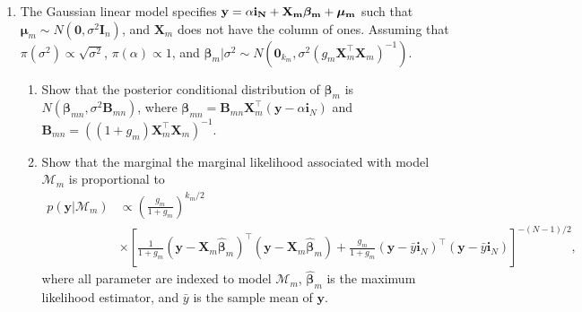 \begin{enumerate}
	\item The Gaussian linear model specifies $\bf{y}=\alpha\bm{i}_N+\bm{X}_m\bm{\beta}_m+\bm{\mu}_m$ such that $\bm{\mu}_m\sim{N}(\bm{0},\sigma^2\bm{I}_n)$, and $\bm{X}_m$ does not have the column of ones. Assuming that $\pi(\sigma^2)\propto \sqrt{\sigma^2}$, $\pi(\alpha)\propto 1$, and $\bm{\beta}_m|\sigma^2 \sim {N}(\bm{0}_{k_m}, \sigma^2 (g_m\bm{X}_m^{\top}\bm{X}_m)^{-1})$.
	\begin{enumerate}
		\item Show that the posterior conditional distribution of $\bm{\beta}_m$ is $N(\bm{\beta}_{mn},\sigma^2\bm{B}_{mn})$, where $\bm{\beta}_{mn}=\bm{B}_{mn}\bm{X}_m^{\top}(\bm{y}-\alpha\bm{i}_N)$ and $\bm{B}_{mn}=((1+g_m)\bm{X}_m^{\top}\bm{X}_m)^{-1}$.
		\item Show that the marginal the marginal likelihood associated with model $\mathcal{M}_m$ is proportional to
		\begin{align*}
			p(\bm{y}|\mathcal{M}_m)&\propto \left(\frac{g_m}{1+g_m}\right)^{k_m/2}\\
			&\times \left[\frac{1}{1+g_m}(\bm{y}-\bm{X}_m\hat{\bm{\beta}}_m)^{\top}(\bm{y}-\bm{X}_m\hat{\bm{\beta}}_m)+\frac{g_m}{1+g_m}(\bm{y}-\bar{y}\bm{i}_N)^{\top}(\bm{y}-\bar{y}\bm{i}_N)\right]^{-(N-1)/2},
		\end{align*}
		where all parameter are indexed to model $\mathcal{M}_m$, $\hat{\bm{\beta}}_m$ is the maximum likelihood estimator, and $\bar{y}$ is the sample mean of $\bm{y}$.   
	\end{enumerate}  
	
\end{enumerate}